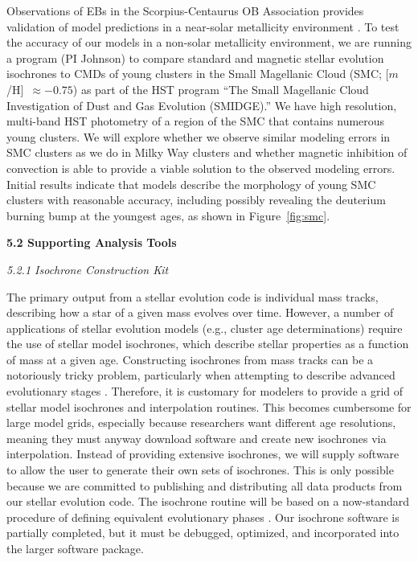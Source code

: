 Observations of EBs in the Scorpius-Centaurus OB Association provides validation of model predictions in a near-solar metallicity environment \citep{}. To test the accuracy of our models in a non-solar metallicity environment, we are running a program (PI Johnson) to compare standard and magnetic stellar evolution isochrones to CMDs of young clusters in the Small Magellanic Cloud (SMC; [$m$/H]~$\approx -0.75$) as part of the HST program ``The Small Magellanic Cloud Investigation of Dust and Gas Evolution (SMIDGE).'' We have high resolution, multi-band HST photometry of a region of the SMC that contains numerous young clusters. We will explore whether we observe similar modeling errors in SMC clusters as we do in Milky Way clusters and whether magnetic inhibition of convection is able to provide a viable solution to the observed modeling errors. Initial results indicate that models describe the morphology of young SMC clusters with reasonable accuracy, including possibly revealing the deuterium burning bump at the youngest ages, as shown in Figure~\ref{fig:smc}. 

{\bf 5.2 Supporting Analysis Tools}


{\it 5.2.1 Isochrone Construction Kit}

The primary output from a stellar evolution code is individual mass tracks, describing how a star of a given mass evolves over time. However, a number of applications of stellar evolution models (e.g., cluster age determinations) require the use of stellar model isochrones, which describe stellar properties as a function of mass at a given age. Constructing isochrones from mass tracks can be a notoriously tricky problem, particularly when attempting to describe advanced evolutionary stages \citep[see, e.g.,][]{Bergbusch1992, Dotter2016}. Therefore, it is customary for modelers to provide a grid of stellar model isochrones and interpolation routines. This becomes cumbersome for large model grids, especially because researchers want different age resolutions, meaning they must anyway download software and create new isochrones via interpolation. Instead of providing extensive isochrones, we will supply software to allow the user to generate their own sets of isochrones. This is only possible because we are committed to publishing and distributing all data products from our stellar evolution code. The isochrone routine will be based on a now-standard procedure of defining equivalent evolutionary phases \citep[EEPs;][]{Bergbusch1992}. Our isochrone software is partially completed, but it must be debugged, optimized, and incorporated into the larger software package.

